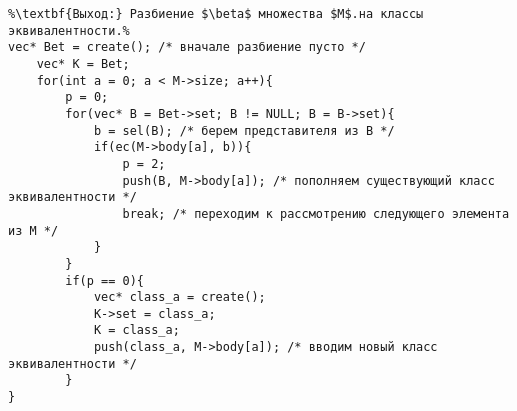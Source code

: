 \begin{lstlisting}[escapechar=\%]
%\noindent\textbf{Вход:} множество $M$, отношение эквивалентности \equiv на $M$.\\%
%\textbf{Выход:} Разбиение $\beta$ множества $M$.на классы эквивалентности.%
vec* Bet = create(); /* вначале разбиение пусто */
	vec* K = Bet;
	for(int a = 0; a < M->size; a++){
		p = 0;
		for(vec* B = Bet->set; B != NULL; B = B->set){
			b = sel(B); /* берем представителя из B */
			if(ec(M->body[a], b)){
				p = 2;
				push(B, M->body[a]); /* пополняем существующий класс эквивалентности */
				break; /* переходим к рассмотрению следующего элемента из М */
			}
		}
		if(p == 0){
			vec* class_a = create();
			K->set = class_a;
			K = class_a;
			push(class_a, M->body[a]); /* вводим новый класс эквивалентности */
		}
}
\end{lstlisting}
